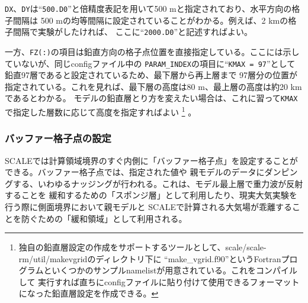 \verb|DX|、\verb|DY|は``\verb|500.D0|''と倍精度表記を用いて500 mと指定されており、水平方向の格子間隔は
500 mの均等間隔に設定されていることがわかる。例えば、2 kmの格子間隔で実験がしたければ、
ここに``\verb|2000.D0|''と記述すればよい。

一方、\verb|FZ(:)|の項目は鉛直方向の格子点位置を直接指定している。ここには示していないが、同じconfigファイル中の
\verb|PARAM_INDEX|の項目に``\verb|KMAX = 97|''として鉛直97層であると設定されているため、最下層から再上層まで
97層分の位置が指定されている。これを見れば、最下層の高度は80 m、最上層の高度は約20 kmであるとわかる。
モデルの鉛直層とり方を変えたい場合は、これに習って\verb|KMAX|で指定した層数に応じて高度を指定すればよい
\footnote{独自の鉛直層設定の作成をサポートするツールとして、scale/scale-rm/util/makevgridのディレクトリ下に
``make\_vgrid.f90''というFortranプログラムといくつかのサンプルnamelistが用意されている。これをコンパイルして
実行すれば直ちにconfigファイルに貼り付けて使用できるフォーマットになった鉛直層設定を作成できる。}
。


\subsubsection{バッファー格子点の設定}

SCALEでは計算領域境界のすぐ内側に「バッファー格子点」を設定することができる。バッファー格子点では、指定された値や
親モデルのデータにダンピングする、いわゆるナッジングが行われる。これは、モデル最上層で重力波が反射することを
緩和するための「スポンジ層」として利用したり、現実大気実験を行う際に側面境界において親モデルと
SCALEで計算される大気場が乖離することを防ぐための「緩和領域」として利用される。

